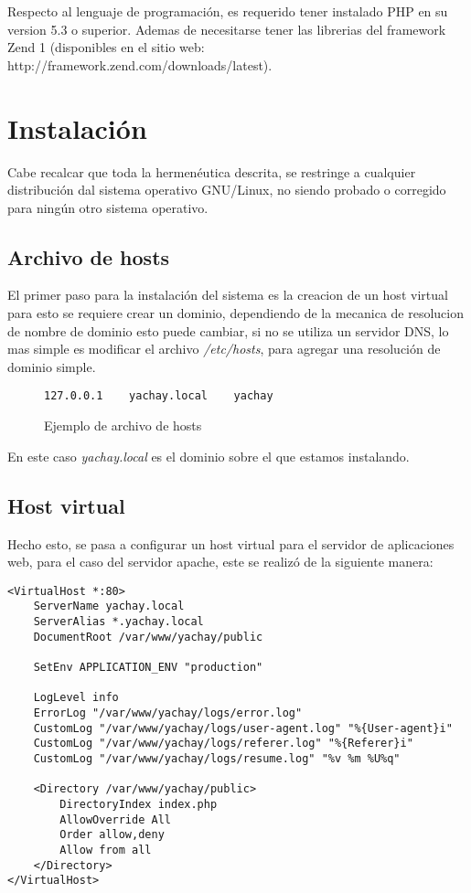 Respecto al lenguaje de programación, es requerido tener instalado PHP en su
version 5.3 o superior. Ademas de necesitarse tener las librerias del framework
Zend 1 (disponibles en el sitio web:
http://framework.zend.com/downloads/latest).

\section{Instalación}
Cabe recalcar que toda la hermenéutica descrita, se restringe a cualquier
distribución dal sistema operativo GNU/Linux, no siendo probado o corregido
para ningún otro sistema operativo.

\subsection{Archivo de hosts}
El primer paso para la instalación del sistema es la creacion de un host virtual
para esto se requiere crear un dominio, dependiendo de la mecanica de resolucion
de nombre de dominio esto puede cambiar, si no se utiliza un servidor DNS, lo
mas simple es modificar el archivo \emph{/etc/hosts}, para agregar una
resolución de dominio simple.

\begin{figure}
\begin{verbatim}
127.0.0.1    yachay.local    yachay
\end{verbatim}
\caption{Ejemplo de archivo de hosts}
\end{figure}

En este caso \emph{yachay.local} es el dominio sobre el que estamos instalando.

\subsection{Host virtual}
Hecho esto, se pasa a configurar un host virtual para el servidor de
aplicaciones web, para el caso del servidor apache, este se realizó de la
siguiente manera:

\small
\begin{verbatim}
<VirtualHost *:80>
    ServerName yachay.local
    ServerAlias *.yachay.local
    DocumentRoot /var/www/yachay/public

    SetEnv APPLICATION_ENV "production"

    LogLevel info
    ErrorLog "/var/www/yachay/logs/error.log"
    CustomLog "/var/www/yachay/logs/user-agent.log" "%{User-agent}i"
    CustomLog "/var/www/yachay/logs/referer.log" "%{Referer}i"
    CustomLog "/var/www/yachay/logs/resume.log" "%v %m %U%q"

    <Directory /var/www/yachay/public>
        DirectoryIndex index.php
        AllowOverride All
        Order allow,deny
        Allow from all
    </Directory>
</VirtualHost>
\end{verbatim}

